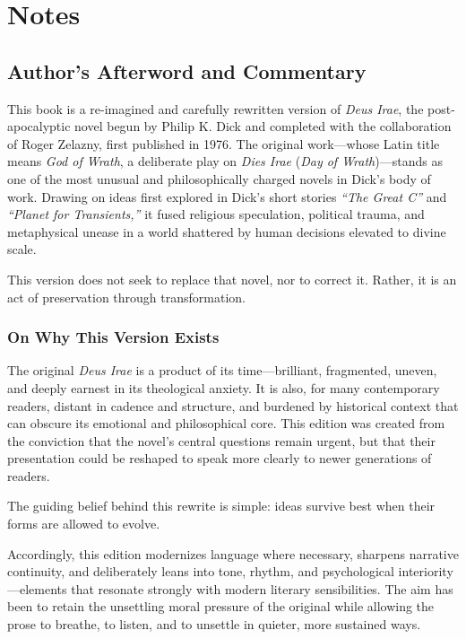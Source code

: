 \cleardoublepage
\chapter*{Notes}

\section*{Author's Afterword and Commentary}

This book is a re-imagined and carefully rewritten version of \emph{Deus Irae}, the post-apocalyptic novel begun by Philip K. Dick and completed with the collaboration of Roger Zelazny, first published in 1976. The original work---whose Latin title means \emph{God of Wrath}, a deliberate play on \emph{Dies Irae} (\emph{Day of Wrath})---stands as one of the most unusual and philosophically charged novels in Dick's body of work. Drawing on ideas first explored in Dick's short stories \emph{``The Great C''} and \emph{``Planet for Transients,''} it fused religious speculation, political trauma, and metaphysical unease in a world shattered by human decisions elevated to divine scale.

This version does not seek to replace that novel, nor to correct it. Rather, it is an act of preservation through transformation.

\subsection*{On Why This Version Exists}

The original \emph{Deus Irae} is a product of its time---brilliant, fragmented, uneven, and deeply earnest in its theological anxiety. It is also, for many contemporary readers, distant in cadence and structure, and burdened by historical context that can obscure its emotional and philosophical core. This edition was created from the conviction that the novel's central questions remain urgent, but that their presentation could be reshaped to speak more clearly to newer generations of readers.

The guiding belief behind this rewrite is simple: ideas survive best when their forms are allowed to evolve.

Accordingly, this edition modernizes language where necessary, sharpens narrative continuity, and deliberately leans into tone, rhythm, and psychological interiority---elements that resonate strongly with modern literary sensibilities. The aim has been to retain the unsettling moral pressure of the original while allowing the prose to breathe, to listen, and to unsettle in quieter, more sustained ways.

